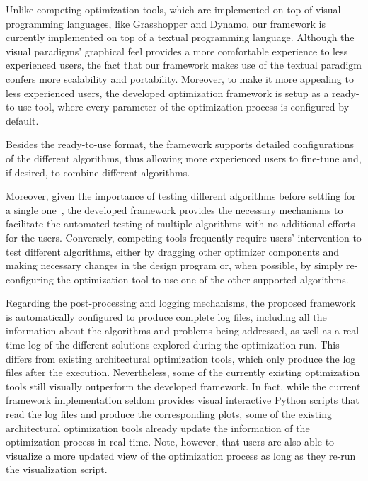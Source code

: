 Unlike competing optimization tools, which are implemented on top of visual programming languages, like Grasshopper and Dynamo, our framework is currently implemented on top of a textual programming language. Although the visual paradigms' graphical feel provides a more comfortable experience to less experienced users, the fact that our framework makes use of the textual paradigm confers more scalability and portability.%
Moreover, to make it more appealing to less experienced users, the developed optimization framework is setup as a ready-to-use tool, where every parameter of the optimization process is configured by default.  

Besides the ready-to-use format, the framework supports detailed configurations of the different algorithms, thus allowing more experienced users to fine-tune and, if desired, to combine different algorithms. 

Moreover, given the importance of testing different algorithms before settling for a single one~\cite{Wortmann2016BBO}, the developed framework provides the necessary mechanisms to facilitate the automated testing of multiple algorithms with no additional efforts for the users. Conversely, competing tools frequently require users' intervention to test different algorithms, either by dragging other optimizer components and making necessary changes in the design program or, when possible, by simply re-configuring the optimization tool to use one of the other supported algorithms. 

Regarding the post-processing and logging mechanisms, the proposed framework is automatically configured to produce complete log files, including all the information about the algorithms and problems being addressed, as well as a real-time log of the different solutions explored during the optimization run. This differs from existing architectural optimization tools, which only produce the log files after the execution. Nevertheless, some of the currently existing optimization tools still visually outperform the developed framework. In fact, while the current framework implementation seldom provides visual interactive Python scripts that read the log files and produce the corresponding plots, some of the existing architectural optimization tools already update the information of the optimization process in real-time. Note, however, that users are also able to visualize a more updated view of the optimization process as long as they re-run the visualization script. 

